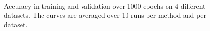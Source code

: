 \documentclass[journal]{IEEEtran}
\begin{document}
\begin{figure}[!ht]
    \centering
{}
    ~
    ~
    ~
    
    \caption{Accuracy in training and validation over 1000 epochs on 4 different datasets. The curves are averaged over 10 runs per method and per dataset.}
    \label{fig:learning}
\end{figure}
 
\end{document}
